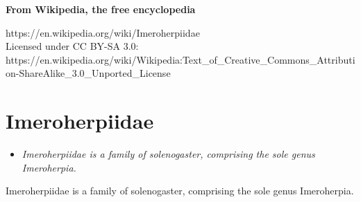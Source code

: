 \textbf{From Wikipedia, the free encyclopedia}

https://en.wikipedia.org/wiki/Imeroherpiidae\\
Licensed under CC BY-SA 3.0:\\
https://en.wikipedia.org/wiki/Wikipedia:Text\_of\_Creative\_Commons\_Attribution-ShareAlike\_3.0\_Unported\_License

\section{Imeroherpiidae}\label{imeroherpiidae}

\begin{itemize}
\item
  \emph{Imeroherpiidae is a family of solenogaster, comprising the sole
  genus Imeroherpia.}
\end{itemize}

Imeroherpiidae is a family of solenogaster, comprising the sole genus
Imeroherpia.

